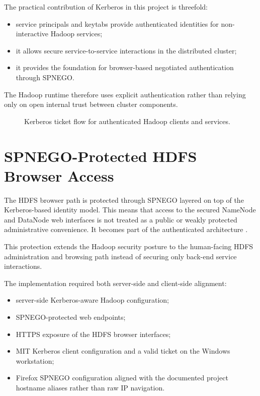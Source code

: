 The practical contribution of Kerberos in this project is threefold:
\begin{itemize}
    \item service principals and keytabs provide authenticated identities for non-interactive Hadoop services;
    \item it allows secure service-to-service interactions in the distributed cluster;
    \item it provides the foundation for browser-based negotiated authentication through SPNEGO.
\end{itemize}

The Hadoop runtime therefore uses explicit authentication rather than relying only on open internal trust between cluster components.

\begin{figure}[H]
    \centering
    
    \caption{Kerberos ticket flow for authenticated Hadoop clients and services.}
    \label{fig:chapter7-kerberos-identity-flow}
\end{figure}

\section{SPNEGO-Protected HDFS Browser Access}
The HDFS browser path is protected through SPNEGO layered on top of the Kerberos-based identity model. This means that access to the secured NameNode and DataNode web interfaces is not treated as a public or weakly protected administrative convenience. It becomes part of the authenticated architecture \cite{apache_hadoop_docs,mit_kerberos_docs}.

This protection extends the Hadoop security posture to the human-facing HDFS administration and browsing path instead of securing only back-end service interactions.

The implementation required both server-side and client-side alignment:
\begin{itemize}
    \item server-side Kerberos-aware Hadoop configuration;
    \item SPNEGO-protected web endpoints;
    \item HTTPS exposure of the HDFS browser interfaces;
    \item MIT Kerberos client configuration and a valid ticket on the Windows workstation;
    \item Firefox SPNEGO configuration aligned with the documented project hostname aliases rather than raw IP navigation.
\end{itemize}

